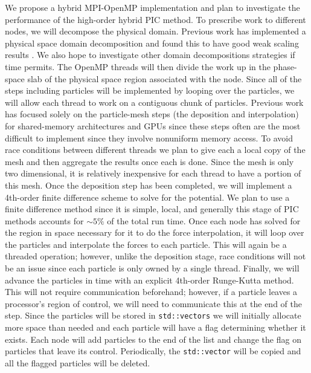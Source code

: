 \documentclass[aps,12pt, notitlepage]{revtex4-1}
\renewcommand{\=}[1]{\overline{#1}}
\begin{document}
We propose a hybrid MPI-OpenMP implementation and plan to investigate the performance of the high-order hybrid PIC method. 
To prescribe work to different nodes, we will decompose the physical domain. Previous work has implemented a physical space domain decomposition and found this to have good weak scaling results \cite{wang2011particle}.
We also hope to investigate other domain decompositions strategies if time permits. 
The OpenMP threads will then divide the work up in the phase-space slab of the physical space region associated with the node.
Since all of the steps including particles will be implemented by looping over the particles, we will allow each thread to work on a contiguous chunk of particles.  
Previous work has focused solely on the particle-mesh steps (the deposition and interpolation) for shared-memory architectures \cite{madduri2012optimization} and GPUs \cite{stantchev2008fast, buyukkecceci2013portable} since these steps often are the most difficult to implement since they involve nonuniform memory access. 
To avoid race conditions between different threads we plan to give each a local copy of the mesh and then aggregate the results once each is done. 
Since the mesh is only two dimensional, it is relatively inexpensive for each thread to have a portion of this mesh. 
Once the deposition step has been completed, we will implement a 4th-order finite difference scheme to solve for the potential.
We plan to use a finite difference method since it is simple, local, and generally this stage of PIC methods accounts for $\sim 5\%$ of the total run time. 
Once each node has solved for the region in space necessary for it to do the force interpolation, it will loop over the particles and interpolate the forces to each particle.
This will again be a threaded operation; however, unlike the deposition stage, race conditions will not be an issue since each particle is only owned by a single thread. 
Finally, we will advance the particles in time with an explicit 4th-order Runge-Kutta method.
This will not require communication beforehand; however, if a particle leaves a processor's region of control, we will need to communicate this at the end of the step. 
Since the particles will be stored in \texttt{std::vectors} we will initially allocate more space than needed and each particle will have a flag determining whether it exists. 
Each node will add particles to the end of the list and change the flag on particles that leave its control.  
Periodically, the \texttt{std::vector} will be copied and all the flagged particles will be deleted. 
\end{document}
